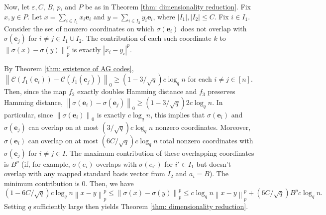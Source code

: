 \documentclass{article}\providecommand{\DeclareRedundantLanguages}[2]{}\usepackage[a4paper,margin=20mm]{geometry}
\newcommand{\1}{\textbf{1}}
\newcommand{\norm}[1]{\left\lVert#1\right\rVert}
\newcommand{\e}{\mathbf{e}}
\begin{document}
Now, let $\varepsilon, C$, $B$, $p$, and $P$ be as in Theorem \ref{thm: dimensionality reduction}. Fix $x, y \in P$. Let $x = \sum_{i \in I_1} x_i \e_i$ and  $y = \sum_{i \in I_2} y_i \e_i$, where $|I_1|, |I_2| \leq C$. Fix $i \in I_1$. Consider the set of nonzero coordinates on which $\sigma(\e_i)$ does not overlap with $\sigma(\e_j)$ for $i \neq j \in I_1 \cup I_2$. The contribution of each such coordinate $k$ to $\norm{\sigma(x) - \sigma(y)}_p^p$ is exactly $|x_i - y_i|^p$. 

By Theorem \ref{thm: existence of AG codes}, $\norm{\mathcal{C}(f_1(\e_i)) - \mathcal{C}(f_1(\e_j))}_0 \geq (1 - 3/\sqrt{q}) c \log_q n$ for each $i \neq j \in [n]$. Then, since the map $f_2$ exactly doubles Hamming distance and $f_3$ preserves Hamming distance, $\norm{\sigma(\e_i) - \sigma(\e_j)}_0 \geq (1 - 3/\sqrt{q}) 2c \log_q n$. In particular, since $\norm{\sigma(\e_i)}_0$ is exactly $c \log_q n$, this implies that $\sigma(\e_i)$ and $\sigma(\e_j)$ can overlap on at most $(3/\sqrt{q}) c\log_q n$ nonzero coordinates. Moreover, $\sigma(\e_i)$ can overlap on at most $(6C/\sqrt{q}) c\log_q n$ total nonzero coordinates with $\sigma(\e_j)$ for $i \neq j \in I$. The maximum contribution of these overlapping coordinates is $B^p$ (if, for example, $\sigma(e_i)$ overlaps with $\sigma(e_{i'})$ for $i' \in I_1$ but doesn't overlap with any mapped standard basis vector from $I_2$ and $a_i = B$). The minimum contribution is $0$. Then, we have 
\[
(1 - 6C/\sqrt{q}) c\log_q n \norm{ x - y}_p^p \leq \norm{\sigma(x) - \sigma(y)}_p^p \leq c\log_q n \norm{ x - y}_p^p + (6C/\sqrt{q})B^p c \log_q n.
\]
Setting $q$ sufficiently large then yields Theorem \ref{thm: dimensionality reduction}.
\end{document}
